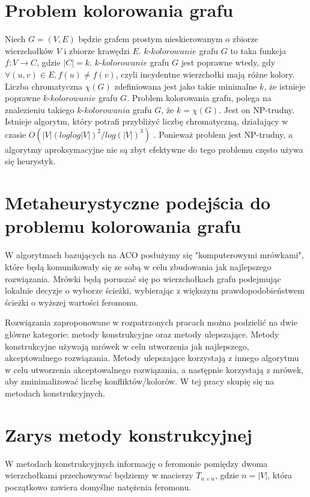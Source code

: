 \documentclass[11pt]{article}
\begin{document}
\section{Problem kolorowania grafu}
Niech $G = (V, E)$ będzie grafem prostym nieskierowanym o zbiorze wierzchołków $V$ i zbiorze krawędzi $E$. $k$-$kolorowanie$ grafu $G$ to taka funkcja $f : V \longrightarrow C$, gdzie $|C| = k$. $k$-$kolorowanie$ grafu $G$ jest poprawne wtedy, gdy $\forall (u, v) \in E, f(u) \neq f(v)$, czyli incydentne wierzchołki mają różne kolory. Liczba chromatyczna $\chi(G)$ zdefiniowana jest jako takie minimalne $k$, że istnieje poprawne $k$-$kolorowanie$ grafu $G$. Problem kolorowania grafu, polega na znalezieniu takiego $k$-$kolorowania$ grafu $G$, że $k = \chi(G)$. Jest on NP-trudny. Istnieje algorytm, który potrafi przybliżyć liczbę chromatyczną, działający w czasie $O(|V|(log log |V|)^2 / log(|V|)^3)$ \cite{HM}. Ponieważ problem jest NP-trudny, a algorytmy aproksymacyjne nie są zbyt efektywne do tego problemu często używa się heurystyk. 

\section{Metaheurystyczne podejścia do problemu kolorowania grafu}
W algorytmach bazujących na ACO posłużymy się "komputerowymi mrówkami", które będą komunikowały się ze sobą w celu zbudowania jak najlepszego rozwiązania. Mrówki będą poruszać się po wierzchołkach grafu podejmując lokalnie decyzje o wyborze ścieżki, wybierając z większym prawdopodobieństwem ścieżki o wyższej wartości feromonu. 

Rozwiązania zaproponowane w rozpatrzonych pracach \cite{ASLSCT, Bessedik, CH, SEH} można podzielić na dwie główne kategorie: metody konstrukcyjne oraz metody ulepszające. Metody konstrukcyjne używają mrówek w celu utworzenia jak najlepszego, akceptowalnego rozwiązania. Metody ulepszające korzystają z innego algorytmu w celu utworzenia akceptowalnego rozwiązania, a następnie korzystają z mrówek, aby zminimalizować liczbę konfliktów/kolorów.  W tej pracy skupię się na metodach konstrukcyjnych. 

\section{Zarys metody konstrukcyjnej}
W metodach konstrukcyjnych informację o feromonie pomiędzy dwoma wierzchołkami przechowywać będziemy w macierzy $T_{n \times n}$, gdzie $n = |V|$, która początkowo zawiera domyślne natężenia feromonu.
\end{document}
